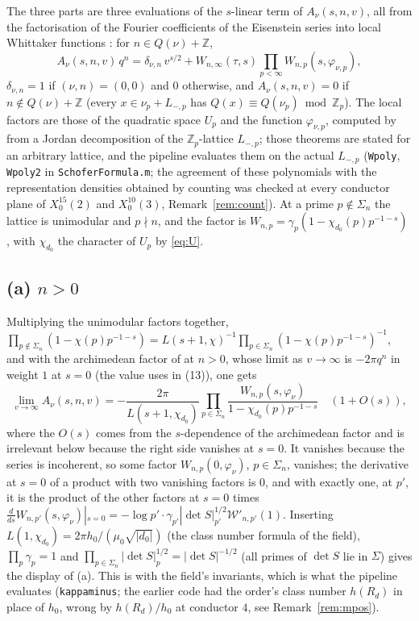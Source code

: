 \documentclass[11pt,reqno]{amsart}
\theoremstyle{plain}
\theoremstyle{definition}
\newcommand{\Z}{\mathbb{Z}}
\begin{document}
The three parts are three evaluations of the $s$-linear term of $A_\nu(s,n,v)$, all from the
factorisation of the Fourier coefficients of the Eisenstein series into local Whittaker functions
\cite[Thm.~2.4 and (4.4)]{KY}: for $n\in Q(\nu)+\Z$,
\begin{equation}\label{eq:factor}
  A_\nu(s,n,v)\,q^n=\delta_{\nu,n}\,v^{s/2}+W_{n,\infty}(\tau,s)\prod_{p<\infty}W_{n,p}(s,\varphi_{\nu,p}),
\end{equation}
$\delta_{\nu,n}=1$ if $(\nu,n)=(0,0)$ and $0$ otherwise, and $A_\nu(s,n,v)=0$ if $n\notin Q(\nu)+\Z$
(every $x\in\nu_p+L_{-,p}$ has $Q(x)\equiv Q(\nu_p)\bmod\Z_p$). The local factors are those of the
quadratic space $U_p$ and the function $\varphi_{\nu,p}$, computed by \cite[Thms.~4.3, 4.4]{KY}
from a Jordan decomposition of the $\Z_p$-lattice $L_{-,p}$; those theorems are stated for an
arbitrary lattice, and the pipeline evaluates them on the actual $L_{-,p}$ (\texttt{Wpoly},
\texttt{Wpoly2} in \texttt{SchoferFormula.m}; the agreement of these polynomials with the
representation densities obtained by counting was checked at every conductor plane of
$X_0^{15}(2)$ and $X_0^{10}(3)$, Remark~\ref{rem:count}). At a prime $p\notin\Sigma_n$ the lattice
is unimodular and $p\nmid n$, and the factor is $W_{n,p}=\gamma_p(1-\chi_{d_0}(p)p^{-1-s})$
\cite[(4.4), Thm.~4.3]{KY}, with $\chi_{d_0}$ the character of $U_p$ by \eqref{eq:U}.

\subsection*{(a) $n>0$}
Multiplying the unimodular factors together, $\prod_{p\notin\Sigma_n}(1-\chi(p)p^{-1-s})=
L(s+1,\chi)^{-1}\prod_{p\in\Sigma_n}(1-\chi(p)p^{-1-s})^{-1}$, and with the archimedean factor of
\cite[Prop.~2.3]{KY} at $n>0$, whose limit as $v\to\infty$ is $-2\pi q^n$ in weight $1$ at $s=0$
(the value \cite{Yang} uses in (13)), one gets
\begin{equation}\label{eq:euler}
  \lim_{v\to\infty}A_\nu(s,n,v)=-\frac{2\pi}{L(s+1,\chi_{d_0})}\prod_{p\in\Sigma_n}
  \frac{W_{n,p}(s,\varphi_\nu)}{1-\chi_{d_0}(p)p^{-1-s}}\quad(1+O(s)),
\end{equation}
where the $O(s)$ comes from the $s$-dependence of the archimedean factor and is irrelevant below
because the right side vanishes at $s=0$. It vanishes because the series is incoherent, so some
factor $W_{n,p}(0,\varphi_\nu)$, $p\in\Sigma_n$, vanishes; the derivative at $s=0$ of a product with
two vanishing factors is $0$, and with exactly one, at $p'$, it is the product of the other factors
at $s=0$ times $\frac{d}{ds}W_{n,p'}(s,\varphi_\nu)|_{s=0}=-\log p'\cdot\gamma_{p'}|\det S|_{p'}^{1/2}
\mathcal W'_{n,p'}(1)$. Inserting $L(1,\chi_{d_0})=2\pi h_0/(\mu_0\sqrt{|d_0|})$ (the class number
formula of the field), $\prod_p\gamma_p=1$ and $\prod_{p\in\Sigma_n}|\det S|_p^{1/2}=|\det S|^{-1/2}$
(all primes of $\det S$ lie in $\Sigma$) gives the display of (a). This is \cite[Lemma~16]{Yang}
with the field's invariants, which is what the pipeline evaluates (\texttt{kappaminus}; the earlier
code had the order's class number $h(R_d)$ in place of $h_0$, wrong by $h(R_d)/h_0$ at conductor
$4$, see Remark~\ref{rem:mpos}).
\end{document}

